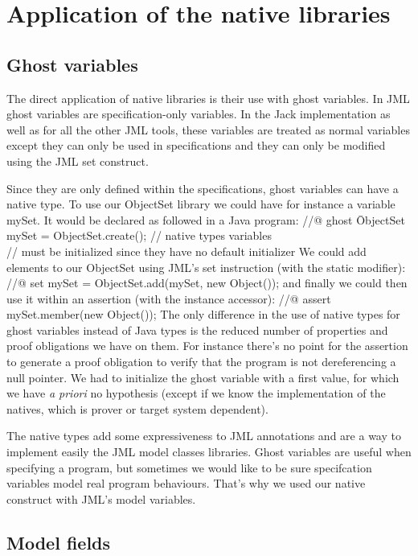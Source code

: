 \section{Application of the native libraries}
\subsection{Ghost variables}
The direct application of native libraries is their use with  ghost variables. 
In JML ghost variables are specification-only variables.
In the Jack implementation as well as for all the other JML tools, 
these variables are treated as normal variables
except they can only be used in specifications and they can only be modified 
using the JML set construct.
 
Since they are only defined within the specifications, ghost variables can have a native type. 
To use our ObjectSet library we could have for instance a variable mySet. It would be 
declared as followed in a Java program:
\btab
 //@ ghost \=ObjectSet mySet = ObjectSet.create(); // native types variables\\
\>//  must be initialized since they have no default initializer
 \etab
 We could add elements to our ObjectSet using JML's set instruction (with the static modifier):
 \btab
 //@ set mySet = ObjectSet.add(mySet, new Object());
 \etab
and  finally we could then use it within an assertion (with the instance accessor):
\btab
 //@ assert mySet.member(new Object());
 \etab
The only difference in the use of native types for ghost variables instead 
of Java types is the reduced number of properties and proof obligations 
we have on them. For instance there's no point for the assertion to generate 
a proof obligation  to verify that the program is not dereferencing a 
null pointer. We had to initialize the ghost variable with a first value, 
for which we have {\it a priori} no hypothesis  (except if we know the
 implementation  of the natives, which is prover or target system dependent).

The native types add some expressiveness to JML annotations and are a way 
to implement easily the JML model classes libraries.
Ghost variables are useful when specifying a program, but sometimes 
we would like to be sure specifcation variables model real program behaviours.
That's why we used our native construct with JML's model variables.



\subsection{Model fields}
